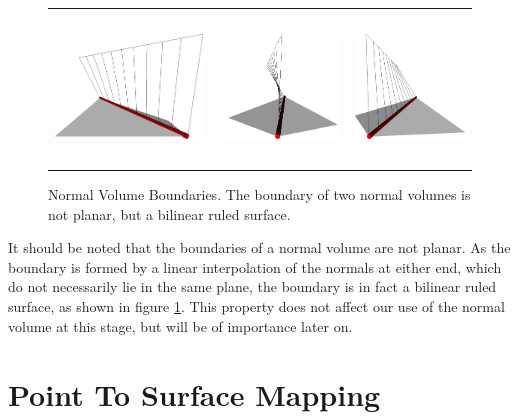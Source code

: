 \begin{figure}
\begin{center}
\begin{tabular}{ccc}
\includegraphics[height=4cm]{../images/ruled_surface_a} &
\includegraphics[height=4cm]{../images/ruled_surface_b} &
\includegraphics[height=4cm]{../images/ruled_surface_c}
\end{tabular}
\caption[Normal Volume Boundaries]{\label{fig:twistednormals} Normal Volume Boundaries. The boundary of two normal volumes is not planar, but a bilinear ruled surface.}
\end{center}
\end{figure}

It should be noted that the boundaries of a normal volume are not planar. As the boundary is formed by a linear interpolation of the normals at either end, which do not necessarily lie in the same plane, the boundary is in fact a bilinear ruled surface, as shown in figure \ref{fig:twistednormals}. This property does not affect our use of the normal volume at this stage, but will be of importance later on.

\section{\label{sec:scandata:pointtosurface}Point To Surface Mapping}

